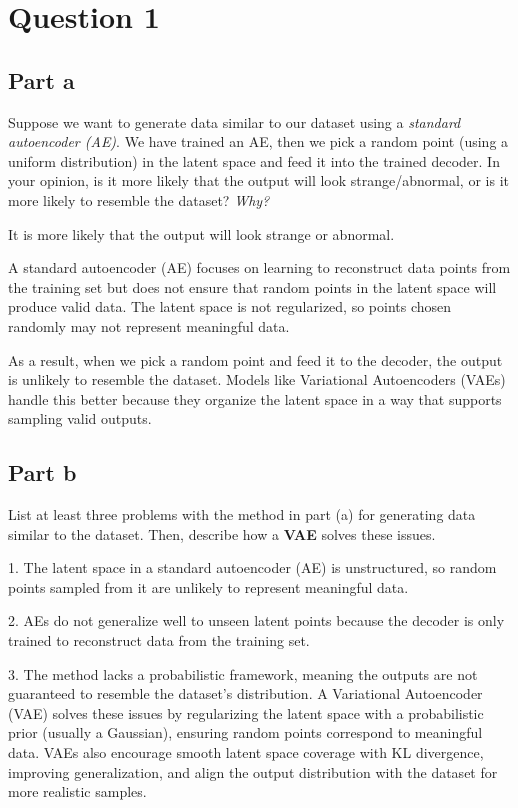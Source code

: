 \section{Question 1}
\subsection{Part a}
Suppose we want to generate data similar to our dataset using a \textit{standard autoencoder (AE)}. We have trained an AE, then we pick a random point (using a uniform distribution) in the latent space and feed it into the trained decoder. In your opinion, is it more likely that the output will look strange/abnormal, or is it more likely to resemble the dataset? \textit{Why?} 
\begin{qsolve}
    \begin{qsolve}[]

        It is more likely that the output will look strange or abnormal. 

        A standard autoencoder (AE) focuses on learning to reconstruct data points from the training set but does not ensure that random points in the latent space will produce valid data. The latent space is not regularized, so points chosen randomly may not represent meaningful data. 

        As a result, when we pick a random point and feed it to the decoder, the output is unlikely to resemble the dataset. Models like Variational Autoencoders (VAEs) handle this better because they organize the latent space in a way that supports sampling valid outputs.

    \end{qsolve}
\end{qsolve}
\subsection{Part b}
List at least three problems with the method in part (a) for generating data similar to
the dataset. Then, describe how a \textbf{VAE} solves these issues.
\begin{qsolve}
    \begin{qsolve}[]
    1. The latent space in a standard autoencoder (AE) is unstructured, so random points sampled from it are unlikely to represent meaningful data.

    2. AEs do not generalize well to unseen latent points because the decoder is only trained to reconstruct data from the training set.

    3. The method lacks a probabilistic framework, meaning the outputs are not guaranteed to resemble the dataset's distribution.
    \splitqsolve[\splitqsolve]
    A Variational Autoencoder (VAE) solves these issues by regularizing the latent space with a probabilistic prior (usually a Gaussian), ensuring random points correspond to meaningful data. VAEs also encourage smooth latent space coverage with KL divergence, improving generalization, and align the output distribution with the dataset for more realistic samples.
    \end{qsolve}
\end{qsolve}
